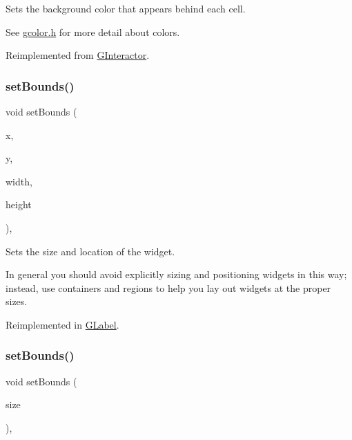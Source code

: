 Sets the background color that appears behind each cell. 

See \mbox{\hyperlink{gcolor_8h_source}{gcolor.\+h}} for more detail about colors. 

Reimplemented from \mbox{\hyperlink{classGInteractor_ab4677ab2474e68b07aa56605af92a84a}{G\+Interactor}}.

\mbox{\label{classGInteractor_a2aae8197624b72265ab83b4f1bc73f2f}} 
\subsubsection{\texorpdfstring{set\+Bounds()}{setBounds()}\hspace{0.1cm}{\footnotesize\ttfamily [1/2]}}
{\footnotesize\ttfamily void set\+Bounds (\begin{DoxyParamCaption}\item[{double}]{x,  }\item[{double}]{y,  }\item[{double}]{width,  }\item[{double}]{height }\end{DoxyParamCaption})\hspace{0.3cm}{\ttfamily [virtual]}, {\ttfamily [inherited]}}



Sets the size and location of the widget. 

In general you should avoid explicitly sizing and positioning widgets in this way; instead, use containers and regions to help you lay out widgets at the proper sizes. 

Reimplemented in \mbox{\hyperlink{classGLabel_ab9f89f193ad29d66c547cfee29ffde39}{G\+Label}}.

\mbox{\label{classGInteractor_acada386653f008cacc7cce86426bef7c}} 
\subsubsection{\texorpdfstring{set\+Bounds()}{setBounds()}\hspace{0.1cm}{\footnotesize\ttfamily [2/2]}}
{\footnotesize\ttfamily void set\+Bounds (\begin{DoxyParamCaption}\item[{const \mbox{\hyperlink{structGRectangle}{G\+Rectangle}} \&}]{size }\end{DoxyParamCaption})\hspace{0.3cm}{\ttfamily [virtual]}, {\ttfamily [inherited]}}



